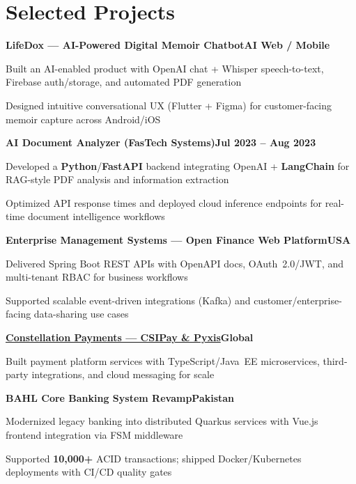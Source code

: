 \documentclass[letterpaper,10pt]{article}
\newcommand{\heading}[2]{
  \hspace{8pt}#1\hfill#2\\
}
\newcommand{\headingBf}[2]{
  \heading{\textbf{#1}}{\textbf{#2}}
}
\newenvironment{resume_list}{
  \vspace{-6pt}
  \begin{itemize}[itemsep=-1px, parsep=0.5pt, topsep=1pt, leftmargin=22pt]
}{
  \end{itemize}
  \vspace{-2pt}
}
\begin{document}
\section{Selected Projects}

\headingBf{LifeDox --- AI-Powered Digital Memoir Chatbot}{AI Web / Mobile}
\begin{resume_list}
  \item Built an AI-enabled product with OpenAI chat + Whisper speech-to-text, Firebase auth/storage, and automated PDF generation
  \item Designed intuitive conversational UX (Flutter + Figma) for customer-facing memoir capture across Android/iOS
\end{resume_list}

\vspace{2pt}
\headingBf{AI Document Analyzer (FasTech Systems)}{Jul 2023 -- Aug 2023}
\begin{resume_list}
  \item Developed a \textbf{Python}/\textbf{FastAPI} backend integrating OpenAI + \textbf{LangChain} for RAG-style PDF analysis and information extraction
  \item Optimized API response times and deployed cloud inference endpoints for real-time document intelligence workflows
\end{resume_list}

\vspace{2pt}
\headingBf{Enterprise Management Systems --- Open Finance Web Platform}{USA}
\begin{resume_list}
  \item Delivered Spring Boot REST APIs with OpenAPI docs, OAuth~2.0/JWT, and multi-tenant RBAC for business workflows
  \item Supported scalable event-driven integrations (Kafka) and customer/enterprise-facing data-sharing use cases
\end{resume_list}

\vspace{2pt}
\headingBf{\href{https://www.constellationpayments.com/}{Constellation Payments --- CSIPay \& Pyxis}}{Global}
\begin{resume_list}
  \item Built payment platform services with TypeScript/Java~EE microservices, third-party integrations, and cloud messaging for scale
\end{resume_list}

\vspace{2pt}
\headingBf{BAHL Core Banking System Revamp}{Pakistan}
\begin{resume_list}
  \item Modernized legacy banking into distributed Quarkus services with Vue.js frontend integration via FSM middleware
  \item Supported \textbf{10,000+} ACID transactions; shipped Docker/Kubernetes deployments with CI/CD quality gates
\end{resume_list}
\end{document}
